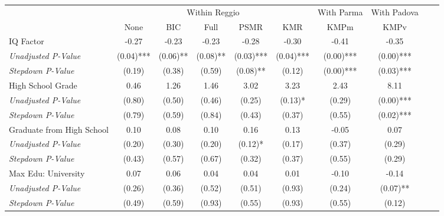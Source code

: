 \begin{tabular}{l c c c c c c c c c}
\toprule
& \multicolumn{5}{c}{Within Reggio} & With Parma & With Padova \\\cmidrule(lr){2-6} \cmidrule(lr){7} \cmidrule(lr){8}
 & None & BIC & Full & PSMR & KMR & KMPm & KMPv \\
\midrule
IQ Factor & -0.27 & -0.23 & -0.23 & -0.28 & -0.30 & -0.41 & -0.35 \\
\quad \textit{Unadjusted P-Value} & (0.04)*** & (0.06)** & (0.08)** & (0.03)*** & (0.04)*** & (0.00)*** & (0.00)*** \\
\quad \textit{Stepdown P-Value} & (0.19) & (0.38) & (0.59) & (0.08)** & (0.12) & (0.00)*** & (0.03)*** \\
High School Grade & 0.46 & 1.26 & 1.46 & 3.02 & 3.23 & 2.43 & 8.11 \\
\quad \textit{Unadjusted P-Value} & (0.80) & (0.50) & (0.46) & (0.25) & (0.13)* & (0.29) & (0.00)*** \\
\quad \textit{Stepdown P-Value} & (0.79) & (0.59) & (0.84) & (0.43) & (0.37) & (0.55) & (0.02)*** \\
Graduate from High School & 0.10 & 0.08 & 0.10 & 0.16 & 0.13 & -0.05 & 0.07 \\
\quad \textit{Unadjusted P-Value} & (0.20) & (0.30) & (0.20) & (0.12)* & (0.17) & (0.37) & (0.29) \\
\quad \textit{Stepdown P-Value} & (0.43) & (0.57) & (0.67) & (0.32) & (0.37) & (0.55) & (0.29) \\
Max Edu: University & 0.07 & 0.06 & 0.04 & 0.04 & 0.01 & -0.10 & -0.14 \\
\quad \textit{Unadjusted P-Value} & (0.26) & (0.36) & (0.52) & (0.51) & (0.93) & (0.24) & (0.07)** \\
\quad \textit{Stepdown P-Value} & (0.49) & (0.59) & (0.93) & (0.55) & (0.93) & (0.55) & (0.12) \\
\bottomrule
\end{tabular}
